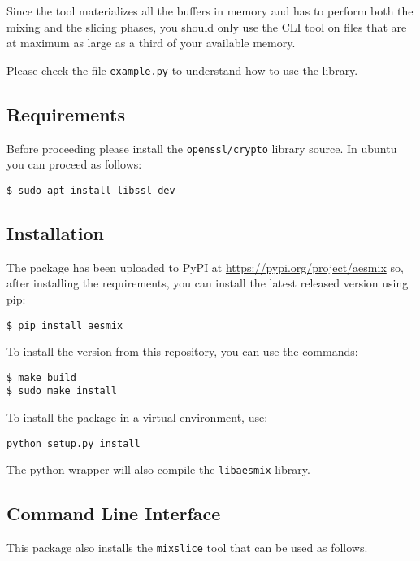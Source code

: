 Since the tool materializes all the buffers in memory and has to perform
both the mixing and the slicing phases, you should only use the CLI tool
on files that are at maximum as large as a third of your available
memory.

Please check the file \texttt{example.py} to understand how to use the
library.

\subsection{Requirements}\label{requirements}

Before proceeding please install the \texttt{openssl/crypto} library
source. In ubuntu you can proceed as follows:

\begin{verbatim}
$ sudo apt install libssl-dev
\end{verbatim}

\subsection{Installation}\label{installation}

The package has been uploaded to PyPI at \url{https://pypi.org/project/aesmix} so, after installing the requirements, you can install the latest released version using pip:

\begin{verbatim}
$ pip install aesmix
\end{verbatim}

To install the version from this repository, you can use the commands:

\begin{verbatim}
$ make build
$ sudo make install
\end{verbatim}

To install the package in a virtual environment, use:

\begin{verbatim}
python setup.py install
\end{verbatim}

The python wrapper will also compile the \texttt{libaesmix} library.

\subsection{Command Line Interface}\label{command-line-interface}

This package also installs the \texttt{mixslice} tool that can be used
as follows.

